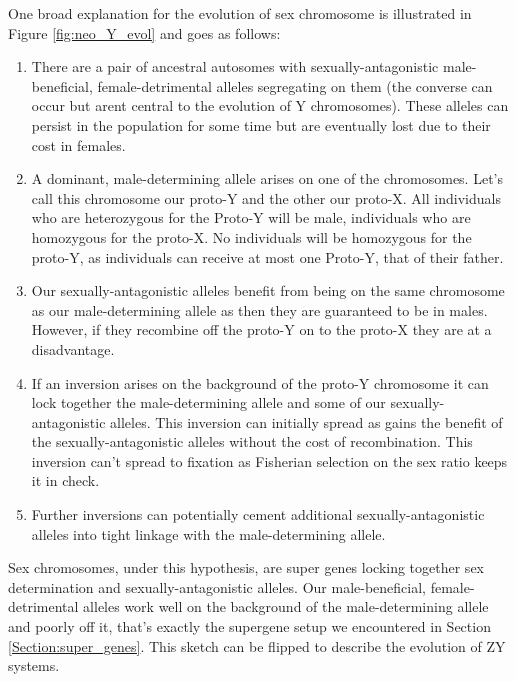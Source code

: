 One broad explanation for the evolution of sex chromosome is illustrated in Figure \ref{fig:neo_Y_evol} and goes as follows:\\
\begin{enumerate}
\item There are a pair of ancestral autosomes with sexually-antagonistic male-beneficial, female-detrimental alleles segregating on them (the converse can occur but arent central to the evolution of Y chromosomes). These alleles can persist in the population for some time but are eventually lost due to their cost in females. 
\item A dominant, male-determining allele arises on one of the chromosomes. Let's call this chromosome our proto-Y and the other our proto-X. All individuals who are heterozygous for the Proto-Y will be male, individuals who are homozygous for the proto-X. No individuals will be homozygous for the proto-Y, as individuals can receive at most one Proto-Y, that of their father. 
\item Our sexually-antagonistic alleles benefit from being on the same chromosome as our male-determining allele as then they are guaranteed to be in males. However, if they recombine off the proto-Y on to the proto-X they are at a disadvantage.
\item If an inversion arises on the background of the proto-Y chromosome it can lock together the male-determining allele and some of our sexually-antagonistic alleles. This inversion can initially spread as gains the benefit of the sexually-antagonistic alleles without the cost of recombination. This inversion can't spread to fixation as Fisherian selection on the sex ratio keeps it in check.
\item Further inversions can potentially cement additional sexually-antagonistic alleles into tight linkage with the male-determining allele.
\end{enumerate}
Sex chromosomes, under this hypothesis, are super genes locking together sex determination and sexually-antagonistic alleles. Our male-beneficial, female-detrimental alleles work well on the background of the male-determining allele and poorly off it, that's exactly the supergene setup we encountered in Section \ref{Section:super_genes}. This sketch can be flipped to describe the evolution of ZY systems. 


